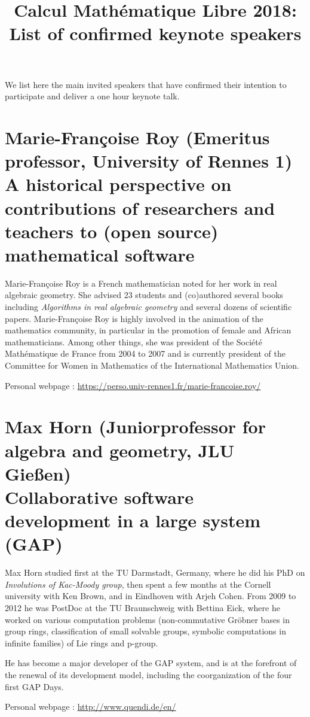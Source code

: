 \documentclass[12pt]{paper}
\title{Calcul Mathématique Libre 2018:\\ List of confirmed keynote speakers}
\date{}
\newcommand{\orateur}[3]{%
  \section*{%
    #1 {\small(#2)}\nopagebreak\\
    #3}
}
\begin{document}
\maketitle
\thispagestyle{empty}

We list here the main invited speakers that have confirmed their
intention to participate and deliver a one hour keynote talk.



\orateur
{Marie-Françoise Roy}
{Emeritus professor, University of Rennes 1}
{A historical perspective on contributions of researchers and teachers
  to (open source) mathematical software}

Marie-Françoise Roy is a French mathematician noted for her work in
real algebraic geometry. She advised 23 students and (co)authored
several books including \textit{Algorithms in real algebraic geometry} and
several dozens of scientific papers. Marie-Françoise Roy is highly
involved in the animation of the mathematics community, in particular
in the promotion of female and African mathematicians. Among other
things, she was president of the Société Mathématique de France from
2004 to 2007 and is currently president of the Committee for Women in
Mathematics of the International Mathematics Union.

Personal webpage : \url{https://perso.univ-rennes1.fr/marie-francoise.roy/}

\orateur
{Max Horn}
{Juniorprofessor for algebra and geometry, JLU Gießen}
{Collaborative software development in a large system (GAP)}
{
  Max Horn studied first at the TU Darmstadt, Germany, where he did
  his PhD on \textit{Involutions of Kac-Moody group}, then spent a few months
  at the Cornell university with Ken Brown, and in Eindhoven with
  Arjeh Cohen. From 2009 to 2012 he was PostDoc at the TU Braunschweig
  with Bettina Eick, where he worked on various computation problems
  (non-commutative Gröbner bases in group rings, classification of
  small solvable groups, symbolic computations in infinite families)
  of Lie rings and p-group.


  He has become a major developer of the GAP system, and is at the
  forefront of the renewal of its development model, including the
  coorganization of the four first GAP Days.

Personal webpage : \url{http://www.quendi.de/en/}
}
\end{document}

